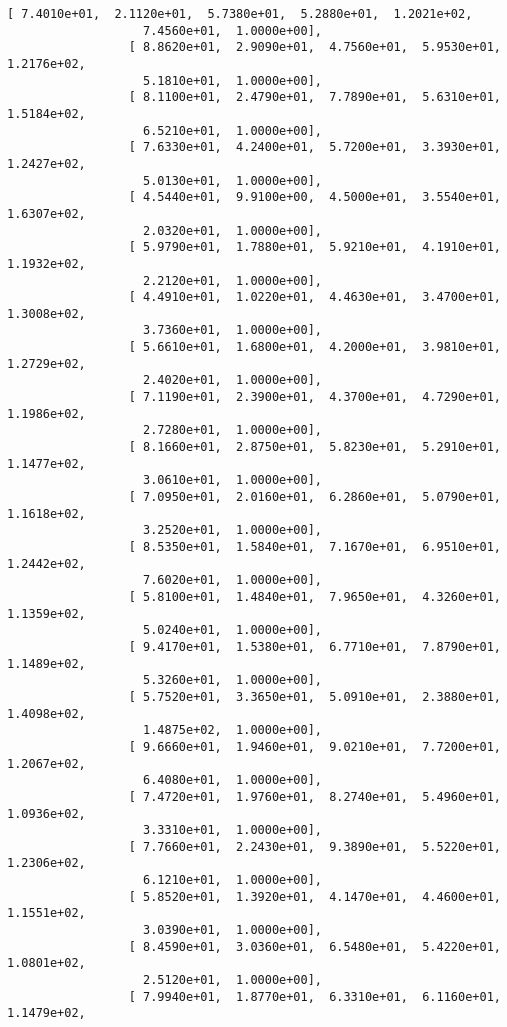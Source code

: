 \documentclass[11pt]{article}
\begin{document}
\begin{Verbatim}[commandchars=\\\{\}]
                 [ 7.4010e+01,  2.1120e+01,  5.7380e+01,  5.2880e+01,  1.2021e+02,
                   7.4560e+01,  1.0000e+00],
                 [ 8.8620e+01,  2.9090e+01,  4.7560e+01,  5.9530e+01,  1.2176e+02,
                   5.1810e+01,  1.0000e+00],
                 [ 8.1100e+01,  2.4790e+01,  7.7890e+01,  5.6310e+01,  1.5184e+02,
                   6.5210e+01,  1.0000e+00],
                 [ 7.6330e+01,  4.2400e+01,  5.7200e+01,  3.3930e+01,  1.2427e+02,
                   5.0130e+01,  1.0000e+00],
                 [ 4.5440e+01,  9.9100e+00,  4.5000e+01,  3.5540e+01,  1.6307e+02,
                   2.0320e+01,  1.0000e+00],
                 [ 5.9790e+01,  1.7880e+01,  5.9210e+01,  4.1910e+01,  1.1932e+02,
                   2.2120e+01,  1.0000e+00],
                 [ 4.4910e+01,  1.0220e+01,  4.4630e+01,  3.4700e+01,  1.3008e+02,
                   3.7360e+01,  1.0000e+00],
                 [ 5.6610e+01,  1.6800e+01,  4.2000e+01,  3.9810e+01,  1.2729e+02,
                   2.4020e+01,  1.0000e+00],
                 [ 7.1190e+01,  2.3900e+01,  4.3700e+01,  4.7290e+01,  1.1986e+02,
                   2.7280e+01,  1.0000e+00],
                 [ 8.1660e+01,  2.8750e+01,  5.8230e+01,  5.2910e+01,  1.1477e+02,
                   3.0610e+01,  1.0000e+00],
                 [ 7.0950e+01,  2.0160e+01,  6.2860e+01,  5.0790e+01,  1.1618e+02,
                   3.2520e+01,  1.0000e+00],
                 [ 8.5350e+01,  1.5840e+01,  7.1670e+01,  6.9510e+01,  1.2442e+02,
                   7.6020e+01,  1.0000e+00],
                 [ 5.8100e+01,  1.4840e+01,  7.9650e+01,  4.3260e+01,  1.1359e+02,
                   5.0240e+01,  1.0000e+00],
                 [ 9.4170e+01,  1.5380e+01,  6.7710e+01,  7.8790e+01,  1.1489e+02,
                   5.3260e+01,  1.0000e+00],
                 [ 5.7520e+01,  3.3650e+01,  5.0910e+01,  2.3880e+01,  1.4098e+02,
                   1.4875e+02,  1.0000e+00],
                 [ 9.6660e+01,  1.9460e+01,  9.0210e+01,  7.7200e+01,  1.2067e+02,
                   6.4080e+01,  1.0000e+00],
                 [ 7.4720e+01,  1.9760e+01,  8.2740e+01,  5.4960e+01,  1.0936e+02,
                   3.3310e+01,  1.0000e+00],
                 [ 7.7660e+01,  2.2430e+01,  9.3890e+01,  5.5220e+01,  1.2306e+02,
                   6.1210e+01,  1.0000e+00],
                 [ 5.8520e+01,  1.3920e+01,  4.1470e+01,  4.4600e+01,  1.1551e+02,
                   3.0390e+01,  1.0000e+00],
                 [ 8.4590e+01,  3.0360e+01,  6.5480e+01,  5.4220e+01,  1.0801e+02,
                   2.5120e+01,  1.0000e+00],
                 [ 7.9940e+01,  1.8770e+01,  6.3310e+01,  6.1160e+01,  1.1479e+02,

\end{Verbatim}
\end{document}
